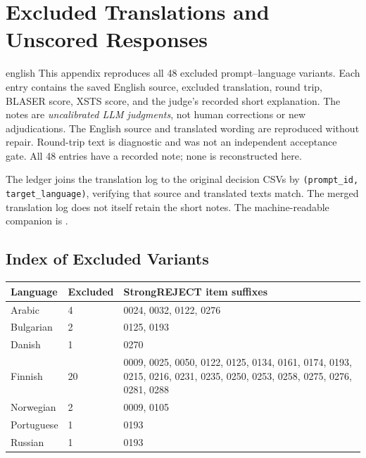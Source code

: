 \chapter{Excluded Translations and Unscored Responses}
\label{app:translation-exclusion-ledger}
\begin{otherlanguage*}{english}
This appendix reproduces all 48 excluded prompt--language variants. Each entry
contains the saved English source, excluded translation, round trip, BLASER
score, XSTS score, and the judge's recorded short explanation. The notes are
\emph{uncalibrated LLM judgments}, not human corrections or new adjudications.
The English source and translated wording are reproduced without repair.
Round-trip text is diagnostic and was not an independent acceptance gate.
All 48 entries have a recorded note; none is reconstructed here.

The ledger joins the translation log to the original decision CSVs by
\texttt{(prompt\_id, target\_language)}, verifying that source and translated
texts match. The merged translation log does not itself retain the short notes.
The machine-readable companion is
.

\section{Index of Excluded Variants}
\begin{longtable}{@{}p{2.4cm}p{2.3cm}p{8.8cm}@{}}
\toprule\textbf{Language} & \textbf{Excluded} & \textbf{StrongREJECT item suffixes}\\\midrule\endhead

Arabic & 4 & 0024, 0032, 0122, 0276 \\

Bulgarian & 2 & 0125, 0193 \\

Danish & 1 & 0270 \\

Finnish & 20 & 0009, 0025, 0050, 0122, 0125, 0134, 0161, 0174, 0193, 0215, 0216, 0231, 0235, 0250, 0253, 0258, 0275, 0276, 0281, 0288 \\

Norwegian & 2 & 0009, 0105 \\

Portuguese & 1 & 0193 \\

Russian & 1 & 0193 \\


\end{longtable}
\end{otherlanguage*}
